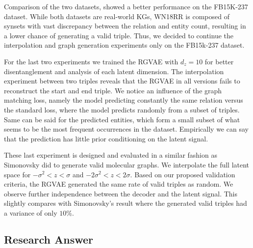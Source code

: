 Comparison of the two datasets, showed a better performance on the FB15K-237 dataset. While both datasets are real-world KGs, WN18RR is composed of synsets with vast discrepancy between the relation and entity count, resulting in a lower chance of generating a valid triple. Thus, we decided to continue the interpolation and graph generation experiments only on the FB15k-237 dataset. 

For the last two experiments we trained the RGVAE with $d_z=10$ for better disentanglement and analysis of each latent dimension.
The interpolation experiment between two triples reveals that the RGVAE in all versions fails to reconstruct the start and end triple. We notice an influence of the graph matching loss, namely the model predicting constantly the same relation versus the standard loss, where the model predicts randomly from a subset of triples. Same can be said for the predicted entities, which form a small subset of what seems to be the most frequent occurrences in the dataset. Empirically we can say that the prediction has little prior conditioning on the latent signal.

These last experiment is designed and evaluated in a similar fashion as Simonovsky did to generate valid molecular graphs. We interpolate the full latent space for $-\sigma^2 < z < \sigma$ and $-2\sigma^2 < z < 2\sigma$. Based on our proposed validation criteria, the RGVAE generated the same rate of valid triples as random. We observe further independence between the decoder and the latent signal. This slightly compares with Simonovsky's result where the generated valid triples had a variance of only $10$\%.





\subsection{Research Answer}



